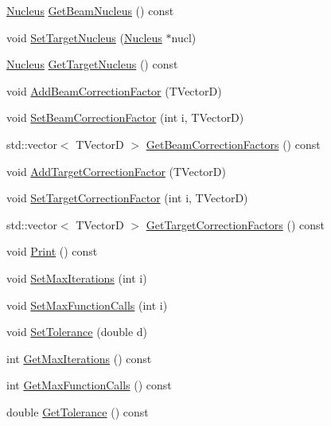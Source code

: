 \begin{DoxyCompactItemize}
\item 
\hyperlink{classNucleus}{Nucleus} \hyperlink{classCoulExSimFitter_a40bc47bee8f51f9dab8763e87c34fb63}{Get\-Beam\-Nucleus} () const 
\item 
void \hyperlink{classCoulExSimFitter_ae7d4c64f558a035a2f3d6993db2969ed}{Set\-Target\-Nucleus} (\hyperlink{classNucleus}{Nucleus} $\ast$nucl)
\item 
\hyperlink{classNucleus}{Nucleus} \hyperlink{classCoulExSimFitter_a6eacf96639a5bd3908636ab253d8c9b3}{Get\-Target\-Nucleus} () const 
\item 
void \hyperlink{classCoulExSimFitter_afe7d584cbdec110df18b34e5bd0bf2dc}{Add\-Beam\-Correction\-Factor} (T\-Vector\-D)
\item 
void \hyperlink{classCoulExSimFitter_a38af2f165ee0e21c2f037b8d8eddee78}{Set\-Beam\-Correction\-Factor} (int i, T\-Vector\-D)
\item 
std\-::vector$<$ T\-Vector\-D $>$ \hyperlink{classCoulExSimFitter_afebf6d2ace4db82026f6ccc865fa821c}{Get\-Beam\-Correction\-Factors} () const 
\item 
void \hyperlink{classCoulExSimFitter_a9c4f96557f62a6f0dbd9386841cd8860}{Add\-Target\-Correction\-Factor} (T\-Vector\-D)
\item 
void \hyperlink{classCoulExSimFitter_af4764a0abfbec937d6aaf51459d741a8}{Set\-Target\-Correction\-Factor} (int i, T\-Vector\-D)
\item 
std\-::vector$<$ T\-Vector\-D $>$ \hyperlink{classCoulExSimFitter_ae528d5210550e3a751a053204d24d7a8}{Get\-Target\-Correction\-Factors} () const 
\item 
void \hyperlink{classCoulExSimFitter_ad2b70cca6d786a23f35231cf931ef65f}{Print} () const 
\item 
void \hyperlink{classCoulExSimFitter_ae8bcedc89a1730f6295cdf862643aa35}{Set\-Max\-Iterations} (int i)
\item 
void \hyperlink{classCoulExSimFitter_a5d482897c57846bf1b83c645843c016f}{Set\-Max\-Function\-Calls} (int i)
\item 
void \hyperlink{classCoulExSimFitter_af2da6ea0d1104d2516d453ee18a234f2}{Set\-Tolerance} (double d)
\item 
int \hyperlink{classCoulExSimFitter_acdbafed7b7924be5e1e4db1f423ec3b9}{Get\-Max\-Iterations} () const 
\item 
int \hyperlink{classCoulExSimFitter_a2b02493b398ecb403eba6d2e7749afbd}{Get\-Max\-Function\-Calls} () const 
\item 
double \hyperlink{classCoulExSimFitter_a798bbe43d1e820d600b3fa2530e7be0b}{Get\-Tolerance} () const 

\end{DoxyCompactItemize}
